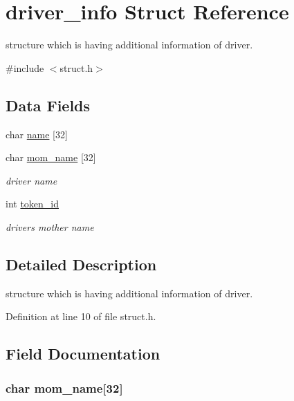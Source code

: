 \hypertarget{structdriver__info}{\section{driver\-\_\-info Struct Reference}
\label{structdriver__info}
}


structure which is having additional information of driver.  




{\ttfamily \#include $<$struct.\-h$>$}

\subsection*{Data Fields}
\begin{DoxyCompactItemize}
\item 
char \hyperlink{structdriver__info_abc1e86d7c344fe34ff09e72d4595ab7e}{name} \mbox{[}32\mbox{]}
\item 
char \hyperlink{structdriver__info_a8a92b71aec641579f64f4764dc91a941}{mom\-\_\-name} \mbox{[}32\mbox{]}
\begin{DoxyCompactList}\small\item\em driver name \end{DoxyCompactList}\item 
int \hyperlink{structdriver__info_ac10e2e2d66be333d039b75217892053d}{token\-\_\-id}
\begin{DoxyCompactList}\small\item\em drivers mother name \end{DoxyCompactList}\end{DoxyCompactItemize}


\subsection{Detailed Description}
structure which is having additional information of driver. 

Definition at line 10 of file struct.\-h.



\subsection{Field Documentation}
\hypertarget{structdriver__info_a8a92b71aec641579f64f4764dc91a941}{
\subsubsection[{mom\-\_\-name}]{\setlength{\rightskip}{0pt plus 5cm}char {\bf mom\-\_\-name}\mbox{[}32\mbox{]}}}\label{structdriver__info_a8a92b71aec641579f64f4764dc91a941}


